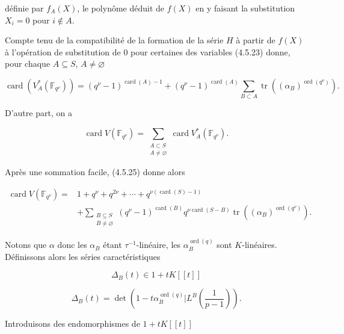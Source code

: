 définie par $f_A(X)$, le polynôme déduit de $f(X)$ en y faisant la
substitution $X_i=0$ pour $i\notin A$.


Compte tenu de la compatibilité de la formation de la série $H$ à partir de
$f(X)$ à l'opération de substitution de 0 pour certaines des variables
(4.5.23) donne, pour chaque $A\subseteq S$, $A\ne\varnothing$

\begin{equation}\tag{4.5.25}
\operatorname{card}(V_A^*(\mathbb F_{q^\nu}))
=(q^\nu-1)^{\operatorname{card}(A)-1}
+(q^\nu-1)^{\operatorname{card}(A)}
\sum_{B\subset A}
\operatorname{tr}\!\left((\alpha_B)^{\operatorname{ord}(q^\nu)}\right).
\end{equation}

D'autre part, on a

\begin{equation}\tag{4.5.26}
\operatorname{card}V(\mathbb F_{q^\nu})
=\sum_{\substack{A\subset S\\A\ne\varnothing}}
\operatorname{card}V_A^*(\mathbb F_{q^\nu}).
\end{equation}

Après une sommation facile, (4.5.25) donne alors

\begin{equation}\tag{4.5.27}
\begin{aligned}
\operatorname{card}V(\mathbb F_{q^\nu})
={}&1+q^\nu+q^{2\nu}+\cdots
+q^{\nu(\operatorname{card}(S)-1)}\\
&+\sum_{\substack{B\subseteq S\\B\ne\varnothing}}
(q^\nu-1)^{\operatorname{card}(B)}
q^{\nu\operatorname{card}(S-B)}
\operatorname{tr}\!\left((\alpha_B)^{\operatorname{ord}(q^\nu)}\right).
\end{aligned}
\end{equation}

Notons que $\alpha$ donc les $\alpha_B$ étant $\tau^{-1}$-linéaire, les
$\alpha_B^{\operatorname{ord}(q)}$ sont $K$-linéaires. Définissons alors les
séries caractéristiques

\[
\Delta_B(t)\in1+tK[[t]]
\]

\begin{equation}\tag{4.5.28}
\Delta_B(t)=\det\!\left(
1-t\alpha_B^{\operatorname{ord}(q)}
\mathrel{\Big|}L^B\!\left(\frac1{p-1}\right)\right).
\end{equation}

Introduisons des endomorphismes de $1+tK[[t]]$

